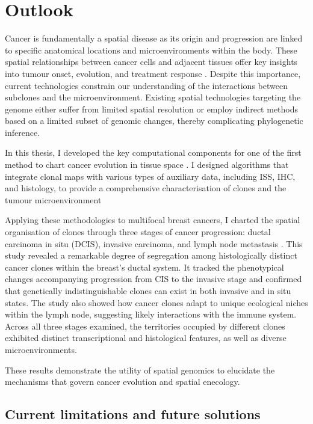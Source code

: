 \chapter{Outlook}
\label{sec:chapter-discussion}

Cancer is fundamentally a spatial disease as its origin and progression are linked to specific anatomical locations and microenvironments within the body. These spatial relationships between cancer cells and adjacent tissues offer key insights into tumour onset, evolution, and treatment response . Despite this importance, current technologies constrain our understanding of the interactions between subclones and the microenvironment. Existing spatial technologies targeting the genome either suffer from limited spatial resolution or employ indirect methods based on a limited subset of genomic changes, thereby complicating phylogenetic inference.

In this thesis, I developed the key computational components for one of the first method to chart cancer evolution in tissue space . 
I designed algorithms that integrate clonal maps with various types of auxiliary data, including \ac{ISS}, \ac{IHC}, and histology, to provide a comprehensive characterisation of clones and the tumour microenvironment 

Applying these methodologies to multifocal breast cancers, I charted the spatial organisation of clones through three stages of cancer progression: ductal carcinoma in situ (\ac{DCIS}), invasive carcinoma, and lymph node metastasis . This study revealed a remarkable degree of segregation among histologically distinct cancer clones within the breast's ductal system. It tracked the phenotypical changes accompanying progression from \ac{CIS} to the invasive stage and confirmed that genetically indistinguishable clones can exist in both invasive and in situ states. The study also showed how cancer clones adapt to unique ecological niches within the lymph node, suggesting likely interactions with the immune system. Across all three stages examined, the territories occupied by different clones exhibited distinct transcriptional and histological features, as well as diverse microenvironments.

These results demonstrate the utility of spatial genomics to elucidate the mechanisms that govern cancer evolution and spatial enecology.

\section{Current limitations and future solutions}

